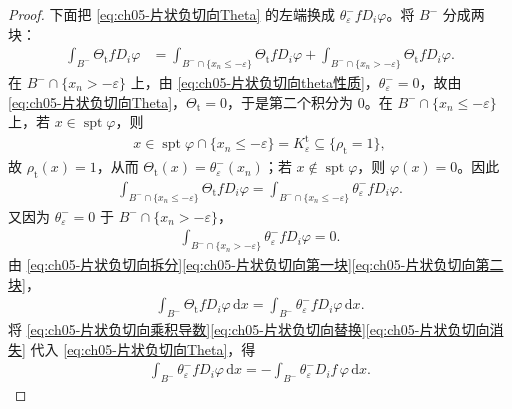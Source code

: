 \documentclass[../../main.tex]{subfiles}
\begin{document}
\begin{proof}
下面把 \eqref{eq:ch05-片状负切向Theta} 的左端换成 $\theta_{\varepsilon}^{-}fD_i\varphi$。将 $B^{-}$ 分成两块：
\begin{align}
\int_{B^{-}}\Theta_{\mathrm{t}}fD_i\varphi
&=\int_{B^{-}\cap\{x_n\leqslant-\varepsilon\}}\Theta_{\mathrm{t}}fD_i\varphi
+\int_{B^{-}\cap\{x_n>-\varepsilon\}}\Theta_{\mathrm{t}}fD_i\varphi.
\label{eq:ch05-片状负切向拆分}
\end{align}
在 $B^{-}\cap\{x_n>-\varepsilon\}$ 上，由 \eqref{eq:ch05-片状负切向theta性质}，$\theta_{\varepsilon}^{-}=0$，故由 \eqref{eq:ch05-片状负切向Theta}，$\Theta_{\mathrm{t}}=0$，于是第二个积分为 $0$。在 $B^{-}\cap\{x_n\leqslant-\varepsilon\}$ 上，若 $x\in\operatorname{spt}\varphi$，则
\begin{align*}
x\in\operatorname{spt}\varphi\cap\{x_n\leqslant-\varepsilon\}=K_{\varepsilon}^{\mathrm{t}}\subseteq\{\rho_{\mathrm{t}}=1\},
\end{align*}
故 $\rho_{\mathrm{t}}(x)=1$，从而 $\Theta_{\mathrm{t}}(x)=\theta_{\varepsilon}^{-}(x_n)$；若 $x\notin\operatorname{spt}\varphi$，则 $\varphi(x)=0$。因此
\begin{align}
\int_{B^{-}\cap\{x_n\leqslant-\varepsilon\}}\Theta_{\mathrm{t}}fD_i\varphi
=\int_{B^{-}\cap\{x_n\leqslant-\varepsilon\}}\theta_{\varepsilon}^{-}fD_i\varphi.
\label{eq:ch05-片状负切向第一块}
\end{align}
又因为 $\theta_{\varepsilon}^{-}=0$ 于 $B^{-}\cap\{x_n>-\varepsilon\}$，
\begin{align}
\int_{B^{-}\cap\{x_n>-\varepsilon\}}\theta_{\varepsilon}^{-}fD_i\varphi=0.
\label{eq:ch05-片状负切向第二块}
\end{align}
由 \eqref{eq:ch05-片状负切向拆分}\eqref{eq:ch05-片状负切向第一块}\eqref{eq:ch05-片状负切向第二块}，
\begin{align}
\int_{B^{-}}\Theta_{\mathrm{t}}fD_i\varphi\,\mathrm{d}x
=\int_{B^{-}}\theta_{\varepsilon}^{-}fD_i\varphi\,\mathrm{d}x.
\label{eq:ch05-片状负切向替换}
\end{align}
将 \eqref{eq:ch05-片状负切向乘积导数}\eqref{eq:ch05-片状负切向替换}\eqref{eq:ch05-片状负切向消失} 代入 \eqref{eq:ch05-片状负切向Theta}，得
\begin{align}
\int_{B^{-}}\theta_{\varepsilon}^{-}fD_i\varphi\,\mathrm{d}x
=-\int_{B^{-}}\theta_{\varepsilon}^{-}D_if\,\varphi\,\mathrm{d}x.
\label{eq:ch05-片状负eps}
\end{align}


\end{proof}
\end{document}
